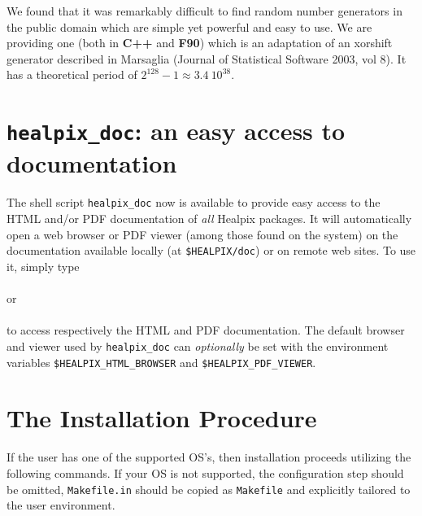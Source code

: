 \documentclass[12pt,twoside]{article}
\begin{document}
We found that it was remarkably difficult to find 
random number generators in the public
domain which are simple yet
powerful and easy to use. 
We are providing one (both in \textbf{C++} and \textbf{F90}) which is an adaptation of an xorshift generator described
 in Marsaglia (Journal of Statistical Software 2003, vol 8). It has a theoretical period of $2^{128}-1 \approx 3.4\ 10^{38}$.



\section{{\tt healpix\_doc}: an easy access to \healpix documentation}
The shell script {\tt healpix\_doc} now is available to provide easy
access to the HTML and/or PDF documentation of {\em all} Healpix packages.
It will automatically open a web browser or PDF viewer (among those found on the
system) on the documentation
available locally (at {\tt \$HEALPIX/doc}) or on remote web sites. To use it, simply type\\
 \\
or \\
\\
to access respectively the HTML and PDF documentation. The default browser and
viewer used by {\tt healpix\_doc} can {\em optionally} be set with the
environment variables
{\tt \$HEALPIX\_HTML\_BROWSER} and
{\tt \$HEALPIX\_PDF\_VIEWER}.


\section{The Installation Procedure}

If the user has one of the supported OS's, then installation proceeds utilizing
the following commands. If your OS is not supported, the configuration step
should be omitted, {\tt Makefile.in} should be copied as {\tt Makefile} and explicitly
tailored to the user environment.
\end{document}
